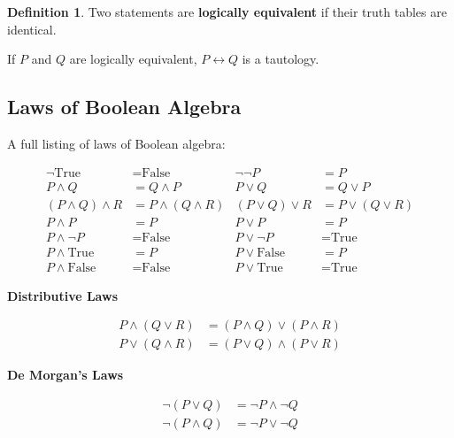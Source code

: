 \documentclass[12pt,a4paper]{article}
\theoremstyle{plain}
\theoremstyle{definition}
\newtheorem{definition}[theorem]{Definition}
\theoremstyle{remark}
\begin{document}
\begin{definition}
    Two statements are \textbf{logically equivalent} if their truth tables are identical.
\end{definition}

If $P$ and $Q$ are logically equivalent, $P \leftrightarrow Q$ is a tautology.

\subsection{Laws of Boolean Algebra}
A full listing of laws of Boolean algebra:

\vspace{-1em}

\begin{align*}
\neg \text{True} &= \text{False} & \neg \neg P &= P \\
P \land Q &= Q \land P & P \lor Q &= Q \lor P \\
(P \land Q) \land R &= P \land (Q \land R) & (P \lor Q) \lor R &= P \lor (Q \lor R) \\
P \land P &= P & P \lor P &= P \\
P \land \neg P &= \text{False} & P \lor \neg P &= \text{True} \\
P \land \text{True} &= P & P \lor \text{False} &= P \\
P \land \text{False} &= \text{False} & P \lor \text{True} &= \text{True}
\end{align*}

\begin{center}
\textbf{Distributive Laws}
\end{center}

\vspace{-2em}

\begin{align*}
P \land (Q \lor R) &= (P \land Q) \lor (P \land R) \\
P \lor (Q \land R) &= (P \lor Q) \land (P \lor R)
\end{align*}

\begin{center}
\textbf{De Morgan's Laws}
\end{center}

\vspace{-2em}

\begin{align*}
\neg (P \lor Q) &= \neg P \land \neg Q \\
\neg (P \land Q) &= \neg P \lor \neg Q
\end{align*}
\end{document}

